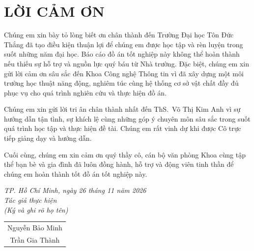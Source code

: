 \clearpage
\pagestyle{empty}
\chapter*{LỜI CẢM ƠN}
\thispagestyle{empty}

\hspace*{\parindent}Chúng em xin bày tỏ lòng biết ơn chân thành đến Trường Đại học Tôn Đức Thắng đã tạo điều kiện thuận lợi để chúng em được học tập và rèn luyện trong suốt những năm đại học. Báo cáo đồ án tốt nghiệp này không thể hoàn thành nếu thiếu sự hỗ trợ và nguồn lực quý báu từ Nhà trường. Đặc biệt, chúng em xin gửi lời cảm ơn sâu sắc đến Khoa Công nghệ Thông tin vì đã xây dựng một môi trường học thuật năng động, nghiêm túc cùng hệ thống cơ sở vật chất đầy đủ phục vụ cho quá trình nghiên cứu và thực hiện đồ án.

Chúng em xin gửi lời tri ân chân thành nhất đến ThS.\ Võ Thị Kim Anh vì sự hướng dẫn tận tình, sự khích lệ cùng những góp ý chuyên môn sâu sắc trong suốt quá trình học tập và thực hiện đề tài. Chúng em rất vinh dự khi được Cô trực tiếp giảng dạy và hướng dẫn.

Cuối cùng, chúng em xin cảm ơn quý thầy cô, cán bộ văn phòng Khoa cùng tập thể bạn bè và gia đình đã luôn đồng hành, hỗ trợ và động viên tinh thần để chúng em hoàn thành tốt đồ án tốt nghiệp này.

\vspace*{1cm}
\begin{flushright}
	\begin{minipage}{8.75cm}
		\centering
		\textit{TP. Hồ Chí Minh, ngày 26 tháng 11 năm 2026}\\
		\textit{Tác giả thực hiện}\\
		\textit{(Ký và ghi rõ họ tên)}\\[1.6cm]

		\begin{tabular}{c}
			Nguyễn Bảo Minh \\[1.6cm]
			Trần Gia Thành \\
		\end{tabular}
	\end{minipage}
\end{flushright}
\clearpage
\pagestyle{fancy}
